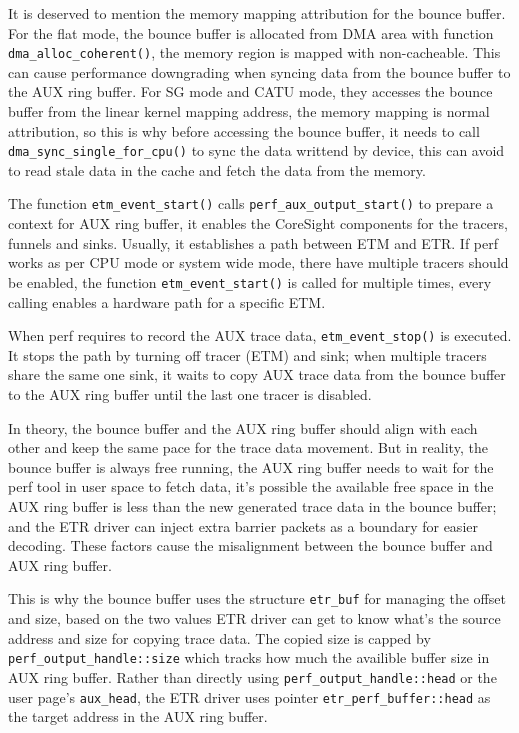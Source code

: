 \documentclass[11pt]{diazessay} %
\def\code#1{\texttt{#1}}
\begin{document}
It is deserved to mention the memory mapping attribution for the bounce buffer.  For the flat mode, the bounce buffer is allocated from DMA area with function \code{dma\_alloc\_coherent()}, the memory region is mapped with non-cacheable.  This can cause performance downgrading when syncing data from the bounce buffer to the AUX ring buffer.  For SG mode and CATU mode, they accesses the bounce buffer from the linear kernel mapping address, the memory mapping is normal attribution, so this is why before accessing the bounce buffer, it needs to call \code{dma\_sync\_single\_for\_cpu()} to sync the data writtend by device, this can avoid to read stale data in the cache and fetch the data from the memory.

The function \code{etm\_event\_start()} calls \code{perf\_aux\_output\_start()} to prepare a context for AUX ring buffer, it enables the CoreSight components for the tracers, funnels and sinks.  Usually, it establishes a path between ETM and ETR.  If perf works as per CPU mode or system wide mode, there have multiple tracers should be enabled, the function \code{etm\_event\_start()} is called for multiple times, every calling enables a hardware path for a specific ETM.

When perf requires to record the AUX trace data, \code{etm\_event\_stop()} is executed.  It stops the path by turning off tracer (ETM) and sink; when multiple tracers share the same one sink, it waits to copy AUX trace data from the bounce buffer to the AUX ring buffer until the last one tracer is disabled.

In theory, the bounce buffer and the AUX ring buffer should align with each other and keep the same pace for the trace data movement.  But in reality, the bounce buffer is always free running, the AUX ring buffer needs to wait for the perf tool in user space to fetch data, it's possible the available free space in the AUX ring buffer is less than the new generated trace data in the bounce buffer; and the ETR driver can inject extra barrier packets as a boundary for easier decoding.  These factors cause the misalignment between the bounce buffer and AUX ring buffer.

This is why the bounce buffer uses the structure \code{etr\_buf} for managing the offset and size, based on the two values ETR driver can get to know what's the source address and size for copying trace data.  The copied size is capped by \code{perf\_output\_handle::size} which tracks how much the availible buffer size in AUX ring buffer.  Rather than directly using \code{perf\_output\_handle::head} or the user page's \code{aux\_head}, the ETR driver uses pointer \code{etr\_perf\_buffer::head} as the target address in the AUX ring buffer.
\end{document}
